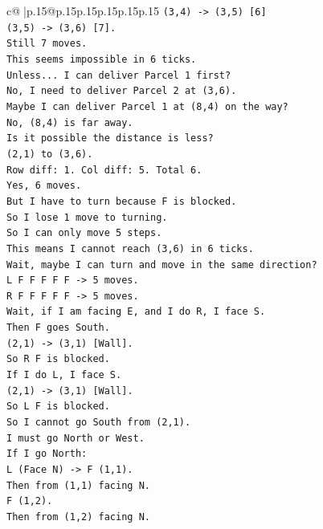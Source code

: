\documentclass{article}
\begin{document}
{\begin{supertabular}{c@{$\;$}|p{.15\linewidth}@{}p{.15\linewidth}p{.15\linewidth}p{.15\linewidth}p{.15\linewidth}p{.15\linewidth}}
{{{\texttt{(3,4) {-}> (3,5) {[}6{]}} \\
\texttt{(3,5) {-}> (3,6) {[}7{]}.} \\
\texttt{Still 7 moves.} \\
\texttt{This seems impossible in 6 ticks.} \\
\texttt{Unless... I can deliver Parcel 1 first?} \\
\texttt{No, I need to deliver Parcel 2 at (3,6).} \\
\texttt{Maybe I can deliver Parcel 1 at (8,4) on the way?} \\
\texttt{No, (8,4) is far away.} \\
\texttt{Is it possible the distance is less?} \\
\texttt{(2,1) to (3,6).} \\
\texttt{Row diff: 1. Col diff: 5. Total 6.} \\
\texttt{Yes, 6 moves.} \\
\texttt{But I have to turn because F is blocked.} \\
\texttt{So I lose 1 move to turning.} \\
\texttt{So I can only move 5 steps.} \\
\texttt{This means I cannot reach (3,6) in 6 ticks.} \\
\texttt{Wait, maybe I can turn and move in the same direction?} \\
\texttt{L F F F F F {-}> 5 moves.} \\
\texttt{R F F F F F {-}> 5 moves.} \\
\texttt{Wait, if I am facing E, and I do R, I face S.} \\
\texttt{Then F goes South.} \\
\texttt{(2,1) {-}> (3,1) {[}Wall{]}.} \\
\texttt{So R F is blocked.} \\
\texttt{If I do L, I face S.} \\
\texttt{(2,1) {-}> (3,1) {[}Wall{]}.} \\
\texttt{So L F is blocked.} \\
\texttt{So I cannot go South from (2,1).} \\
\texttt{I must go North or West.} \\
\texttt{If I go North:} \\
\texttt{L (Face N) {-}> F (1,1).} \\
\texttt{Then from (1,1) facing N.} \\
\texttt{F (1,2).} \\
\texttt{Then from (1,2) facing N.} \\
}}}
\end{supertabular}}
\end{document}
